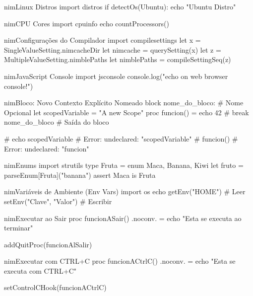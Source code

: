 \documentclass[10pt, a4paper]{article}
\begin{document}
\begin{multicols}{4}
\begin{codebox}{nim}{Linux Distros}
import distros
if detectOs(Ubuntu): echo "Ubuntu Distro"
\end{codebox}


\begin{codebox}{nim}{CPU Cores}
import cpuinfo
echo countProcessors()
\end{codebox}


\begin{codebox}{nim}{Configurações do Compilador}
import compilesettings
let x = SingleValueSetting.nimcacheDir
let nimcache = querySetting(x)
let z = MultipleValueSetting.nimblePaths
let nimblePaths = compileSettingSeq(z)
\end{codebox}


\begin{codebox}{nim}{JavaScript Console}
import jsconsole
console.log("echo on web browser console!")
\end{codebox}


\begin{codebox}{nim}{Bloco: Novo Contexto Explícito Nomeado}
block nome_do_bloco: # Nome Opcional
  let scopedVariable = "A new Scope"
  proc funcion() = echo 42
  # break nome_do_bloco # Saída do bloco

# echo scopedVariable
# Error: undeclared: "scopedVariable"
# funcion()
# Error: undeclared: "funcion"
\end{codebox}


\begin{codebox}{nim}{Enums}
import strutils
type Fruta = enum Maca, Banana, Kiwi
let fruto = parseEnum[Fruta]("banana")
assert Maca is Fruta
\end{codebox}


\begin{codebox}{nim}{Variáveis de Ambiente (Env Vars)}
import os
echo getEnv("HOME") # Leer
setEnv("Clave", "Valor") # Escribir
\end{codebox}


\begin{codebox}{nim}{Executar ao Sair}
proc funcionASair() {.noconv.} =
  echo "Esta se executa ao terminar"

addQuitProc(funcionAlSalir)
\end{codebox}


\begin{codebox}{nim}{Executar com CTRL+C}
proc funcionACtrlC() {.noconv.} =
  echo "Esta se executa com CTRL+C"

setControlCHook(funcionACtrlC)
\end{codebox}



\end{multicols}
\end{document}
